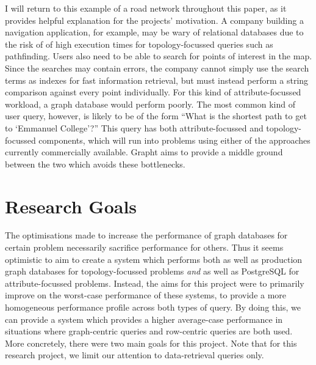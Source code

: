 I will return to this example of a road network throughout this paper, as it
provides helpful explanation for the projects' motivation. A company building a navigation
application, for example, may be wary of relational databases due to the risk of 
of high execution times for topology-focussed queries such as pathfinding. 
Users also need to be able to search for points of interest in the map. Since the searches
may contain errors, the company cannot simply use the search terms as indexes for fast
information retrieval, but must instead perform a string comparison against every point individually. For this kind
of attribute-focussed workload, a graph database would perform poorly. The most common kind of user query,
however, is likely to be of the form ``What is the shortest path to get to `Emmanuel College'?'' This 
query has both attribute-focussed and topology-focussed components, which will run into problems
using either of the approaches currently commercially available. Grapht aims to
provide a middle ground between the two which avoids these bottlenecks.


\section{Research Goals}

The optimisations made to increase the performance of graph databases for
certain problem necessarily sacrifice performance for others. Thus it seems
optimistic to aim to create a system which performs both as well as production
graph databases for topology-focussed problems \textit{and} as well as
PostgreSQL for attribute-focussed problems. Instead, the aims for this project
were to primarily improve on the worst-case performance of these systems, to
provide a more homogeneous performance profile across both types of query. By
doing this, we can provide a system which provides a higher average-case
performance in situations where graph-centric queries and row-centric queries
are both used. More concretely, there were two main goals for this project.
Note that for this research project, we limit our attention to data-retrieval
queries only.





